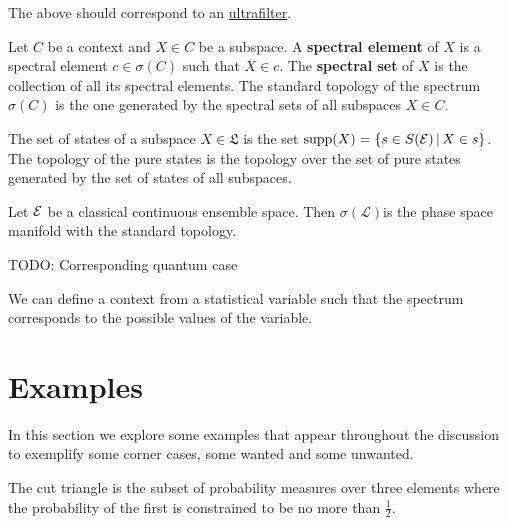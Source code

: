 \begin{remark}
	The above should correspond to an \href{https://en.wikipedia.org/wiki/Ultrafilter}{ultrafilter}.
\end{remark}

\begin{defn}
	Let $C$ be a context and $X \in C$ be a subspace. A \textbf{spectral element} of $X$ is a spectral element $c \in \sigma(C)$ such that $X \in c$. The \textbf{spectral set} of $X$ is the collection of all its spectral elements. The standard topology of the spectrum $\sigma(C)$ is the one generated by the spectral sets of all subspaces $X \in C$.
\end{defn}

\begin{defn}
	The set of states of a subspace $X \in \mathfrak{L}$ is the set $\mathrm{supp}(X) = \{ s \in S(\mathcal{E}) \, | \, X \in s \}$. The topology of the pure states is the topology over the set of pure states generated by the set of states of all subspaces.
\end{defn}

\begin{conj}
	Let $\mathcal{E}$ be a classical continuous ensemble space. Then $\sigma(\mathcal{L})$is the phase space manifold with the standard topology.
\end{conj}

\begin{conj}
	TODO: Corresponding quantum case
\end{conj}

\begin{conj}
	We can define a context from a statistical variable such that the spectrum corresponds to the possible values of the variable.
\end{conj}

\section{Examples}

In this section we explore some examples that appear throughout the discussion to exemplify some corner cases, some wanted and some unwanted.

\begin{example}\label{pm_es_cutTriangle}
	The cut triangle is the subset of probability measures over three elements where the probability of the first is constrained to be no more than $\frac{1}{2}$.
\end{example}

